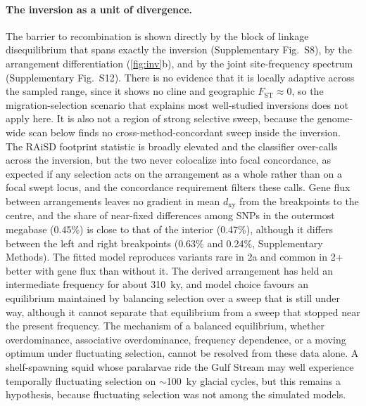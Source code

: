\documentclass[11pt]{article}
\newcommand{\Fst}{F_\mathrm{ST}}
\newcommand{\dxy}{d_\mathrm{xy}}
\begin{document}
\paragraph{The inversion as a unit of divergence.} 
The barrier to recombination is shown directly by the block of linkage disequilibrium that spans exactly the 
inversion (Supplementary Fig.~S8), by the arrangement differentiation (\cref{fig:inv}b), and 
by the joint site-frequency spectrum (Supplementary Fig.~S12).
There is no evidence that it is locally adaptive across the sampled range, since it shows
no cline and geographic $\Fst\approx0$, so the migration-selection scenario that
explains most well-studied inversions \citep{kirkpatrick2006} does not apply here.
It is also not a region of strong selective sweep, because the genome-wide scan below finds no
cross-method-concordant sweep inside the inversion. The RAiSD footprint
statistic is broadly elevated and the classifier over-calls across the
inversion, but the two never colocalize into focal concordance, as expected if any selection acts on the arrangement as a whole rather than on a focal swept locus, and the
concordance requirement filters these calls. Gene flux between arrangements leaves no gradient in mean $\dxy$ from the breakpoints to the centre, and the share of near-fixed differences among SNPs in the outermost megabase (0.45\%) is close to that of the interior (0.47\%), although it differs between the left and right breakpoints (0.63\% and 0.24\%, Supplementary Methods). The fitted model reproduces variants rare in 2a and common in 2+ better with gene flux than
without it. The derived arrangement has held an intermediate frequency for about 310~ky, and model choice favours an equilibrium maintained by balancing selection over a sweep that is still under way, although it cannot separate that equilibrium from a sweep that stopped near the present frequency. The mechanism of a balanced equilibrium, whether overdominance, associative
overdominance, frequency dependence, or a moving optimum under fluctuating selection, cannot be resolved from
these data alone. A shelf-spawning squid whose paralarvae ride the Gulf Stream may well experience temporally fluctuating selection on $\sim$100~ky glacial cycles, but this remains a hypothesis, because fluctuating selection was not among the simulated models.
\end{document}
